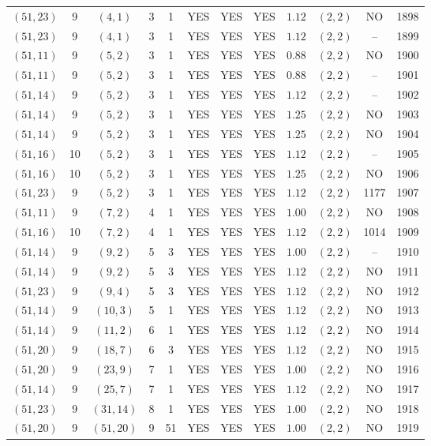 \begin{longtable}{|c|c|c|c|c|c|c|c|c|c|c|c|}
$(51,23)$ & 9 & $(4,1)$ & 3 & 1 & YES & YES & YES & $1.12$ & $(2,2)$ & NO & 1898\\
$(51,23)$ & 9 & $(4,1)$ & 3 & 1 & YES & YES & YES & $1.12$ & $(2,2)$ & -- & 1899\\
$(51,11)$ & 9 & $(5,2)$ & 3 & 1 & YES & YES & YES & $0.88$ & $(2,2)$ & NO & 1900\\
$(51,11)$ & 9 & $(5,2)$ & 3 & 1 & YES & YES & YES & $0.88$ & $(2,2)$ & -- & 1901\\
$(51,14)$ & 9 & $(5,2)$ & 3 & 1 & YES & YES & YES & $1.12$ & $(2,2)$ & -- & 1902\\
$(51,14)$ & 9 & $(5,2)$ & 3 & 1 & YES & YES & YES & $1.25$ & $(2,2)$ & NO & 1903\\
$(51,14)$ & 9 & $(5,2)$ & 3 & 1 & YES & YES & YES & $1.25$ & $(2,2)$ & NO & 1904\\
$(51,16)$ & 10 & $(5,2)$ & 3 & 1 & YES & YES & YES & $1.12$ & $(2,2)$ & -- & 1905\\
$(51,16)$ & 10 & $(5,2)$ & 3 & 1 & YES & YES & YES & $1.25$ & $(2,2)$ & NO & 1906\\
$(51,23)$ & 9 & $(5,2)$ & 3 & 1 & YES & YES & YES & $1.12$ & $(2,2)$ & 1177 & 1907\\
$(51,11)$ & 9 & $(7,2)$ & 4 & 1 & YES & YES & YES & $1.00$ & $(2,2)$ & NO & 1908\\
$(51,16)$ & 10 & $(7,2)$ & 4 & 1 & YES & YES & YES & $1.12$ & $(2,2)$ & 1014 & 1909\\
$(51,14)$ & 9 & $(9,2)$ & 5 & 3 & YES & YES & YES & $1.00$ & $(2,2)$ & -- & 1910\\
$(51,14)$ & 9 & $(9,2)$ & 5 & 3 & YES & YES & YES & $1.12$ & $(2,2)$ & NO & 1911\\
$(51,23)$ & 9 & $(9,4)$ & 5 & 3 & YES & YES & YES & $1.12$ & $(2,2)$ & NO & 1912\\
$(51,14)$ & 9 & $(10,3)$ & 5 & 1 & YES & YES & YES & $1.12$ & $(2,2)$ & NO & 1913\\
$(51,14)$ & 9 & $(11,2)$ & 6 & 1 & YES & YES & YES & $1.12$ & $(2,2)$ & NO & 1914\\
$(51,20)$ & 9 & $(18,7)$ & 6 & 3 & YES & YES & YES & $1.12$ & $(2,2)$ & NO & 1915\\
$(51,20)$ & 9 & $(23,9)$ & 7 & 1 & YES & YES & YES & $1.00$ & $(2,2)$ & NO & 1916\\
$(51,14)$ & 9 & $(25,7)$ & 7 & 1 & YES & YES & YES & $1.12$ & $(2,2)$ & NO & 1917\\
$(51,23)$ & 9 & $(31,14)$ & 8 & 1 & YES & YES & YES & $1.00$ & $(2,2)$ & NO & 1918\\
$(51,20)$ & 9 & $(51,20)$ & 9 & 51 & YES & YES & YES & $1.00$ & $(2,2)$ & NO & 1919\\

\end{longtable}
